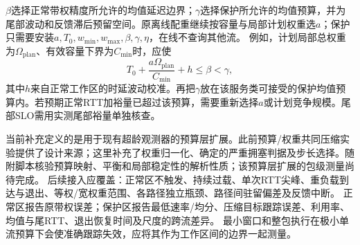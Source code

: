 \documentclass[10pt,a4paper]{ctexart}
\begin{document}
$\beta$选择正常带权精度所允许的均值延迟边界；$\gamma$选择保护所允许的均值预算，并为尾部波动和反馈滞后预留空间。原离线配重继续按容量与局部计划权重选$a$；保护只需要安装$a,T_0,w_{\min},w_{\max},\beta,\gamma,\eta$，在线不查询其他流。
例如，计划局部总权重为$\Omega_{\mathrm{plan}}$、有效容量下界为$C_{\min}$时，应使
\[
 T_0+\frac{a\Omega_{\mathrm{plan}}}{C_{\min}}+h\le\beta<\gamma,
\]
其中$h$来自正常工作区的时延波动校准。再把$\gamma$放在该服务类可接受的保护均值预算内。若预期正常RTT加裕量已超过该预算，需要重新选择$a$或计划竞争规模。尾部SLO需用实测尾部裕量单独核查。

当前补充定义的是用于现有超龄观测器的预算层扩展。此前预算/权重共同压缩实验提供了设计来源；这里补充了权重归一化、确定的严重拥塞判据及步长选择。随附脚本核验预算映射、平衡和局部稳定性的解析性质；该预算层扩展的包级测量尚待完成。
后续接入应覆盖：正常区不触发、持续过载、单次RTT尖峰、重负载到达与退出、等权/宽权重范围、各路径独立瓶颈、路径间驻留偏差及反馈中断。
正常区报告原带权误差；保护区报告最低速率/均分、压缩目标跟踪误差、利用率、均值与尾RTT、退出恢复时间及尺度的跨流差异。
最小窗口和整包执行在极小单流预算下会使准确跟踪失效，应将其作为工作区间的边界一起测量。
\end{document}
